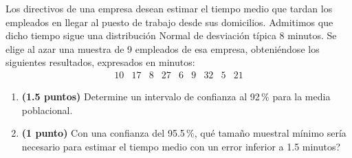 
Los directivos de una empresa desean estimar el tiempo medio que tardan los empleados en llegar al puesto de trabajo desde sus domicilios. Admitimos que dicho tiempo sigue una distribución Normal de desviación típica 8 minutos. Se elige al azar una muestra de 9 empleados de esa empresa, obteniéndose los siguientes resultados, expresados en minutos:
\[
\begin{array}{rrrrrrrrr}
10 & 17 & 8 & 27 & 6 & 9 & 32 & 5 & 21
\end{array}
\]
\begin{enumerate}[label=\alph*),leftmargin=2.4em]
  \item \textbf{(1.5 puntos)} Determine un intervalo de confianza al 92\,\% para la media poblacional.
  \item \textbf{(1 punto)} Con una confianza del 95.5\,\%, \textquestiondown{}qué tamaño muestral mínimo sería necesario para estimar el tiempo medio con un error inferior a 1.5 minutos?
\end{enumerate}
